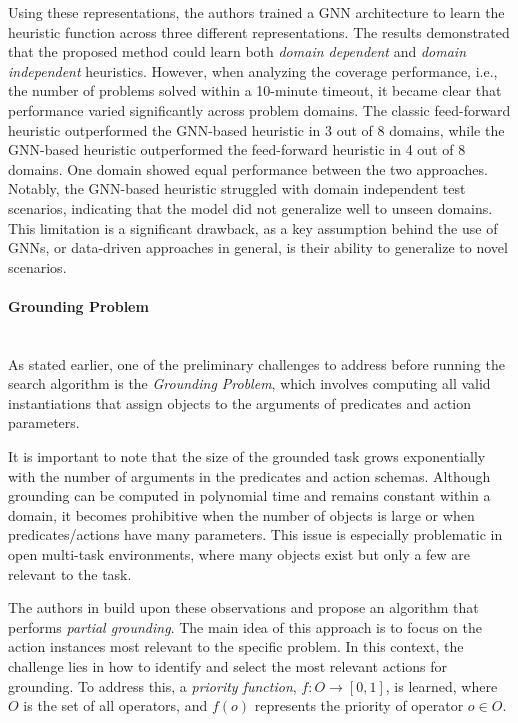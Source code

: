 Using these representations, the authors trained a GNN architecture to learn the heuristic function across three different representations. The results demonstrated that the proposed method could learn both \textit{domain dependent} and \textit{domain independent} heuristics. However, when analyzing the coverage performance, i.e., the number of problems solved within a 10-minute timeout, it became clear that performance varied significantly across problem domains. The classic feed-forward heuristic outperformed the GNN-based heuristic in 3 out of 8 domains, while the GNN-based heuristic outperformed the feed-forward heuristic in 4 out of 8 domains. One domain showed equal performance between the two approaches. Notably, the GNN-based heuristic struggled with domain independent test scenarios, indicating that the model did not generalize well to unseen domains. This limitation is a significant drawback, as a key assumption behind the use of GNNs, or data-driven approaches in general, is their ability to generalize to novel scenarios.

\paragraph*{Grounding Problem}\mbox{}\\
As stated earlier, one of the preliminary challenges to address before running the search algorithm is the \textit{Grounding Problem}, which involves computing all valid instantiations that assign objects to the arguments of predicates and action parameters.

It is important to note that the size of the grounded task grows exponentially with the number of arguments in the predicates and action schemas. Although grounding can be computed in polynomial time and remains constant within a domain, it becomes prohibitive when the number of objects is large or when predicates/actions have many parameters. This issue is especially problematic in open multi-task environments, where many objects exist but only a few are relevant to the task.

The authors in \cite{gnad2019learning} build upon these observations and propose an algorithm that performs \textit{partial grounding}. The main idea of this approach is to focus on the action instances most relevant to the specific problem. In this context, the challenge lies in how to identify and select the most relevant actions for grounding. To address this, a \textit{priority function}, $f: O \rightarrow \left[0, 1\right]$, is learned, where $O$ is the set of all operators, and $f(o)$ represents the priority of operator $o \in O$.

